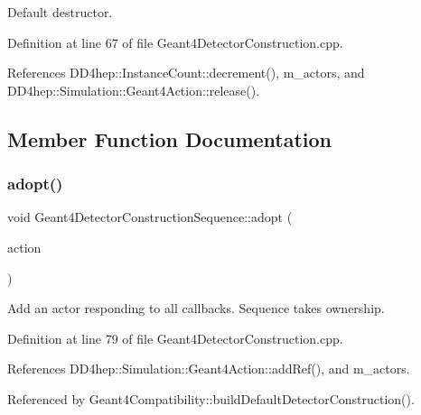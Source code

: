 Default destructor. 



Definition at line 67 of file Geant4\+Detector\+Construction.\+cpp.



References D\+D4hep\+::\+Instance\+Count\+::decrement(), m\+\_\+actors, and D\+D4hep\+::\+Simulation\+::\+Geant4\+Action\+::release().



\subsection{Member Function Documentation}
\hypertarget{class_d_d4hep_1_1_simulation_1_1_geant4_detector_construction_sequence_a883d0336b5983474af9479c03e90a35b}{}\label{class_d_d4hep_1_1_simulation_1_1_geant4_detector_construction_sequence_a883d0336b5983474af9479c03e90a35b} 
\subsubsection{\texorpdfstring{adopt()}{adopt()}}
{\footnotesize\ttfamily void Geant4\+Detector\+Construction\+Sequence\+::adopt (\begin{DoxyParamCaption}\item[{\hyperlink{class_d_d4hep_1_1_simulation_1_1_geant4_detector_construction}{Geant4\+Detector\+Construction} $\ast$}]{action }\end{DoxyParamCaption})}



Add an actor responding to all callbacks. Sequence takes ownership. 



Definition at line 79 of file Geant4\+Detector\+Construction.\+cpp.



References D\+D4hep\+::\+Simulation\+::\+Geant4\+Action\+::add\+Ref(), and m\+\_\+actors.



Referenced by Geant4\+Compatibility\+::build\+Default\+Detector\+Construction().

\hypertarget{class_d_d4hep_1_1_simulation_1_1_geant4_detector_construction_sequence_a3aedc4fa1c4ac699d1b4bf0586cc8d22}{}\label{class_d_d4hep_1_1_simulation_1_1_geant4_detector_construction_sequence_a3aedc4fa1c4ac699d1b4bf0586cc8d22} 
